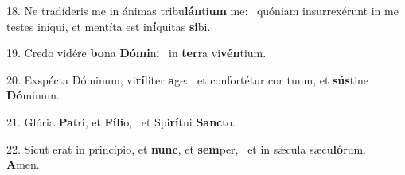 18. Ne tradíderis me in ánimas tribu\textbf{lán}ti\textbf{um} me: \ast\  quóniam insurrexérunt in me testes iníqui, et mentíta est in\textbf{í}quitas \textbf{si}bi.\

19. Credo vidére \textbf{bo}na \textbf{Dó}\textbf{mi}ni \ast\  in \textbf{ter}ra vi\textbf{vén}tium.\

20. Exspécta Dóminum, vi\textbf{rí}liter \textbf{a}ge: \ast\  et confortétur cor tuum, et \textbf{sús}tine \textbf{Dó}minum.\

21. Glória \textbf{Pa}tri, et \textbf{Fí}\textbf{li}o, \ast\  et Spi\textbf{rí}tui \textbf{Sanc}to.\

22. Sicut erat in princípio, et \textbf{nunc}, et \textbf{sem}per, \ast\  et in sǽcula sæcu\textbf{ló}rum. \textbf{A}men.\

